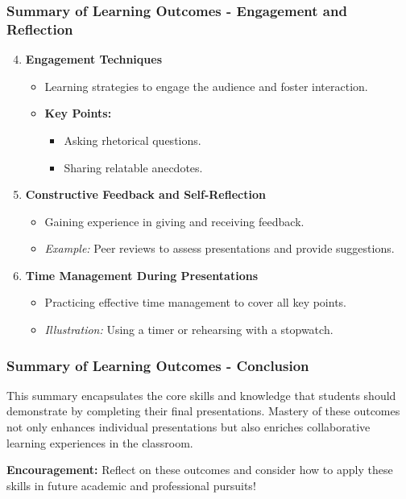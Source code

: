 \documentclass[aspectratio=169]{beamer}
\begin{document}
\begin{frame}[fragile]
    \frametitle{Summary of Learning Outcomes - Engagement and Reflection}
    \begin{enumerate}
        \setcounter{enumi}{3}
        \item \textbf{Engagement Techniques}
        \begin{itemize}
            \item Learning strategies to engage the audience and foster interaction.
            \item \textbf{Key Points:}
            \begin{itemize}
                \item Asking rhetorical questions.
                \item Sharing relatable anecdotes. 
            \end{itemize}
        \end{itemize}

        \item \textbf{Constructive Feedback and Self-Reflection}
        \begin{itemize}
            \item Gaining experience in giving and receiving feedback.
            \item \textit{Example:} Peer reviews to assess presentations and provide suggestions.
        \end{itemize}
        
        \item \textbf{Time Management During Presentations}
        \begin{itemize}
            \item Practicing effective time management to cover all key points.
            \item \textit{Illustration:} Using a timer or rehearsing with a stopwatch.
        \end{itemize}
    \end{enumerate}
\end{frame}

\begin{frame}[fragile]
    \frametitle{Summary of Learning Outcomes - Conclusion}
    This summary encapsulates the core skills and knowledge that students should demonstrate by completing their final presentations. 
    Mastery of these outcomes not only enhances individual presentations but also enriches collaborative learning experiences in the classroom.
    
    \textbf{Encouragement:} Reflect on these outcomes and consider how to apply these skills in future academic and professional pursuits!
\end{frame}
\end{document}
